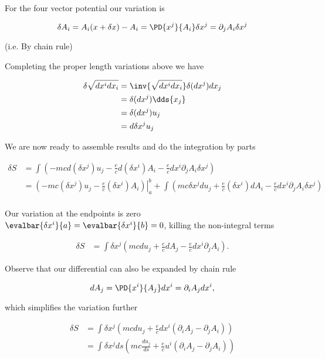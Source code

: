 For the four vector potential our variation is

\begin{equation}\label{eqn:relativisticElectrodynamicsL10:310}
\delta A_i = A_i(x + \delta x) - A_i = \PD{x^j}{A_i} \delta x^j = \partial_j A_i \delta x^j
\end{equation}

(i.e. By chain rule)

Completing the proper length variations above we have

\begin{align*}
\delta \sqrt{ dx^i dx_i } 
&= \inv{ \sqrt{ dx^i dx_i }} \delta (dx^j) dx_j \\
&= \delta (dx^j) \dds{x_j}  \\
&= \delta (dx^j) u_j \\
&= d \delta x^j u_j
\end{align*}

We are now ready to assemble results and do the integration by parts

\begin{align*}
\delta S 
&= \int \left( 
-m c d (\delta x^j) u_j
- \frac{e}{c} d (\delta x^i) A_i 
- \frac{e}{c} dx^i \partial_j A_i \delta x^j
\right) \\
&= 
{\left. 
\left( -m c (\delta x^j) u_j - \frac{e}{c} (\delta x^i) A_i \right)
\right\vert}_a^b
+\int \left( 
m c \delta x^j d u_j
+ \frac{e}{c} (\delta x^i) d A_i 
- \frac{e}{c} dx^i \partial_j A_i \delta x^j
\right) \\
\end{align*}

Our variation at the endpoints is zero $\evalbar{\delta x^i}{a} = \evalbar{\delta x^i}{b} = 0$, killing the non-integral terms

\begin{align*}
\delta S 
&= 
\int 
\delta x^j
\left( 
m c d u_j
+ \frac{e}{c} d A_j 
- \frac{e}{c} dx^i \partial_j A_i 
\right).
\end{align*}

Observe that our differential can also be expanded by chain rule

\begin{equation}\label{eqn:relativisticElectrodynamicsL10:330}
d A_j = \PD{x^i}{A_j} dx^i = \partial_i A_j dx^i,
\end{equation}

which simplifies the variation further

\begin{align*}
\delta S 
&= 
\int 
\delta x^j
\left( 
m c d u_j
+ \frac{e}{c} dx^i ( \partial_i A_j - \partial_j A_i )
\right) \\
&= 
\int 
\delta x^j ds
\left( 
m c \frac{d u_j}{ds}
+ \frac{e}{c} u^i ( \partial_i A_j - \partial_j A_i )
\right) \\
\end{align*}

